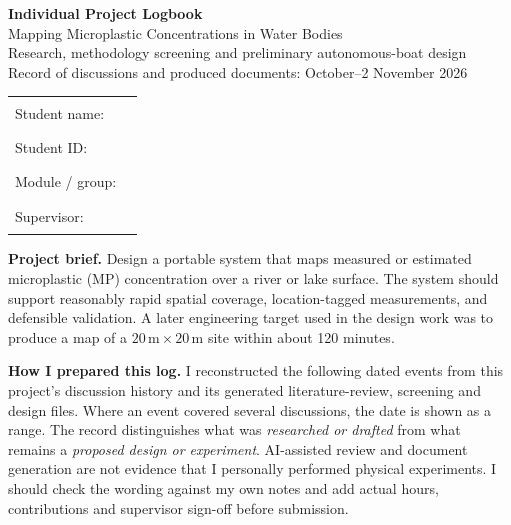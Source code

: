 \documentclass[11pt,a4paper]{article}
\begin{document}
\begin{center}
{\LARGE\bfseries Individual Project Logbook}\\[4pt]
{\large Mapping Microplastic Concentrations in Water Bodies}\\[4pt]
{\small Research, methodology screening and preliminary autonomous-boat design}\\[2pt]
{\small Record of discussions and produced documents: October--2 November 2026}
\end{center}
\vspace{5pt}
\begin{tabular}{@{}ll@{}}
Student name: & \rule{110mm}{.4pt}\\[6pt]
Student ID: & \rule{110mm}{.4pt}\\[6pt]
Module / group: & \rule{110mm}{.4pt}\\[6pt]
Supervisor: & \rule{110mm}{.4pt}
\end{tabular}
\vspace{9pt}

\textbf{Project brief.} Design a portable system that maps measured or estimated microplastic (MP) concentration over a river or lake surface. The system should support reasonably rapid spatial coverage, location-tagged measurements, and defensible validation. A later engineering target used in the design work was to produce a map of a $20\,\mathrm{m}\times20\,\mathrm{m}$ site within about 120 minutes.

\textbf{How I prepared this log.} I reconstructed the following dated events from this project's discussion history and its generated literature-review, screening and design files. Where an event covered several discussions, the date is shown as a range. The record distinguishes what was \emph{researched or drafted} from what remains a \emph{proposed design or experiment}. AI-assisted review and document generation are not evidence that I personally performed physical experiments. I should check the wording against my own notes and add actual hours, contributions and supervisor sign-off before submission.
\end{document}
